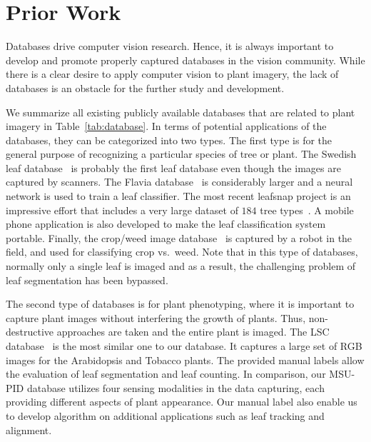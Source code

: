 \section{Prior Work}
\label{sec:prior}

Databases drive computer vision research. Hence, it is always important to develop and promote properly captured databases in the vision community. While there is a clear desire to apply computer vision to plant imagery, the lack of databases is an obstacle for the further study and development.


We summarize all existing publicly available databases that are related to plant imagery in Table~\ref{tab:database}. In terms of potential applications of the databases, they can be categorized into two types. The first type is for the general purpose of recognizing a particular species of tree or plant. The Swedish leaf database~\cite{soderkvist2001computer} is probably the first leaf database even though the images are captured by scanners. The Flavia database~\cite{wu2007leaf} is considerably larger and a neural network is used to train a leaf classifier. The most recent leafsnap project is an impressive effort that includes a very large dataset of $184$ tree types~\cite{kumar2012leafsnap}. A mobile phone application is also developed to make the leaf classification system portable. Finally, the crop/weed image database~\cite{haug2014crop} is captured by a robot in the field, and used for classifying crop vs.~weed. Note that in this type of databases, normally only a single leaf is imaged and as a result, the challenging problem of leaf segmentation has been bypassed.

The second type of databases is for plant phenotyping, where it is important to capture plant images without interfering the growth of plants. Thus, non-destructive approaches are taken and the entire plant is imaged. The LSC database~\cite{scharr2014annotated} is the most similar one to our database. It captures a large set of RGB images for the Arabidopsis and Tobacco plants. The provided manual labels allow the evaluation of leaf segmentation and leaf counting. In comparison, our MSU-PID database utilizes four sensing modalities in the data capturing, each providing different aspects of plant appearance.
Our manual label also enable us to develop algorithm on additional applications such as leaf tracking and alignment.

